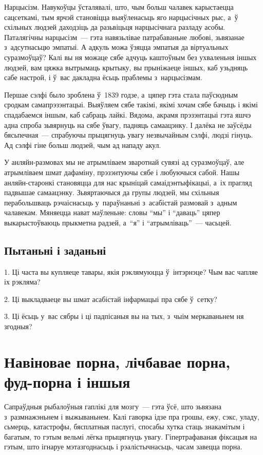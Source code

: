 Нарцысізм. Навукоўцы ўсталявалі, што, чым больш чалавек карыстаецца сацсеткамі, тым ярчэй становіцца выяўленасьць яго нарцысічных рыс, а~ў схільных людзей даходзіць да разьвіцьця нарцысічнага разладу асобы. Паталягічны нарцысізм~--- гэта навязьлівае патрабаваньне любові, зьвязанае з~адсутнасьцю эмпатыі. А адкуль можа ўзяцца эмпатыя да віртуальных суразмоўцаў? Калі вы ня можаце сябе адчуць каштоўным без ухваленьня іншых людзей, вам цяжка вытрымаць крытыку, вы прыніжаеце іншых, каб узьдняць сабе настрой, і ў~вас дакладна ёсьць праблемы з~нарцысізмам.

Першае сэлфі было зроблена ў~1839 годзе, а~цяпер гэта стала паўсюдным сродкам самапрэзэнтацыі. Выяўляем сябе такімі, якімі хочам сябе бачыць і якімі спадабаемся іншым, каб сабраць лайкі. Вядома, акрамя прэзэнтацыі гэта яшчэ адна спроба зьвярнуць на сябе ўвагу, падняць самаацэнку. І далёка не заўсёды бясьпечная~--- спрабуючы прыцягнуць увагу незвычайным сэлфі, людзі гінуць. Ад сэлфі гіне больш людзей, чым ад нападу акул.

У анляйн-размовах мы не атрымліваем зваротнай сувязі ад суразмоўцаў, але атрымліваем шмат дафаміну, прэзэнтуючы сябе і любуючыся сабой. Нашы анляйн-старонкі становяцца для нас крыніцай самаідэнтыфікацыі, а~іх прагляд падвышае самаацэнку. Зьвяртаючыся да групы людзей, мы схільныя перабольшваць рэчаіснасьць у~параўнаньні з~асабістай размовай з~адным чалавекам. Мяняецца нават маўленьне: словы ``мы'' і ``даваць'' цяпер выкарыстоўваюць прыкметна радзей, а~``я'' і ``атрымліваць''~--- часьцей.

\subsection*{Пытаньні і заданьні}

1. Ці часта вы купляеце тавары, якія рэклямуюцца ў~інтэрнэце? Чым вас чапляе іх рэкляма?

2. Ці выкладваеце вы шмат асабістай інфармацыі пра сябе ў~сетку?

3. Ці ёсьць у~вас сябры і ці падпісаныя вы на тых, з~чыім меркаваньнем ня згодныя?


\section{Навіновае порна, лічбавае порна, фуд-порна і іншыя}

Сапраўдныя рыбалоўныя гаплікі для мозгу~--- гэта ўсё, што зьвязана з~размнажэньнем і выжываньнем. Калі гаворка ідзе пра грошы, ежу, сэкс, уладу, сьмерць, катастрофы, бясплатныя паслугі, спосабы хутка стаць знакамітым і багатым, то гэтым вельмі лёгка прыцягнуць увагу. Гіпертрафаваная фіксацыя на гэтым, што ігнаруе мэтазгоднасьць і рэалістычнасьць, часам завецца порна.

